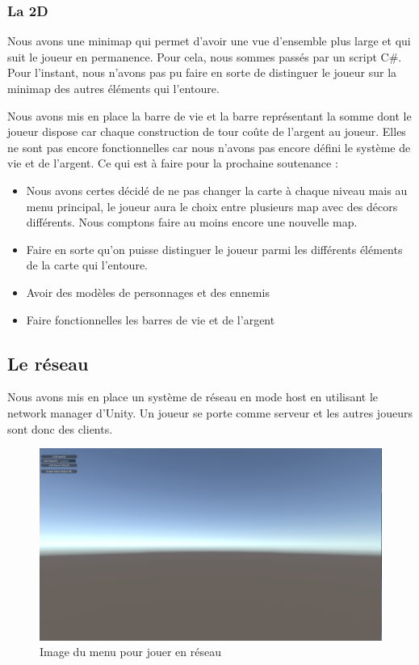 \documentclass[a4paper, 12pt]{article}
\begin{document}
		\subsubsection{La 2D}
Nous avons une minimap qui permet d’avoir une vue d’ensemble plus large et qui suit le joueur en permanence. Pour cela, nous sommes passés par un script C\#.  Pour l’instant, nous n’avons pas pu faire en sorte de distinguer le joueur sur la minimap des autres éléments qui l’entoure.
\par Nous avons mis en place la barre de vie et la barre représentant la somme dont le joueur dispose car chaque construction de tour coûte de l’argent au joueur. Elles ne sont pas encore fonctionnelles car nous n’avons pas encore défini le système de vie et de l’argent.
Ce qui est à faire pour la prochaine soutenance :
\begin{itemize}
\item Nous avons certes décidé de ne pas changer la carte à chaque niveau mais au menu principal, le joueur aura le choix entre plusieurs map avec des décors différents. Nous comptons faire au moins encore une nouvelle map.
\item Faire en sorte qu’on puisse distinguer le joueur parmi les différents éléments de la carte qui l’entoure.
\item Avoir des modèles de personnages et des ennemis
\item Faire fonctionnelles les barres de vie et de l’argent

\end{itemize}

\newpage

	\subsection{Le réseau}
Nous avons mis en place un système de réseau en mode host en utilisant le network manager d’Unity. Un joueur se porte comme serveur et les autres joueurs sont donc des clients.\\


\begin{figure}[!ht]
	\centerline{\includegraphics[scale=0.3]{Menureseauprojet.png}}
	\caption*{Image du menu pour jouer en réseau}
\end{figure}
\end{document}
